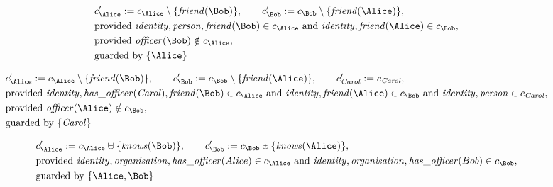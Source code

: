 \begin{align*}
&
c'_
{
\Alice
}
 := 
c_
{
\Alice
}
 \setminus 
\{
\mathit{\detokenize{
friend
}}
(
\Bob
)
\}
, \qquad 
c'_
{
\Bob
}
 := 
c_
{
\Bob
}
 \setminus 
\{
\mathit{\detokenize{
friend
}}
(
\Alice
)
\}
,\\
&
\text{provided } 
\mathit{\detokenize{
identity
}}
,
\mathit{\detokenize{
person
}}
,
\mathit{\detokenize{
friend
}}
(
\Bob
)
 \in c_
{
\Alice
}
 \text{ and } 
\mathit{\detokenize{
identity
}}
,
\mathit{\detokenize{
friend
}}
(
\Alice
)
 \in c_
{
\Bob
}
,\\
&
\text{provided } 
\mathit{\detokenize{
officer
}}
(
\Bob
)
 \notin c_
{
\Alice
}
,\\
&
\text{guarded by } \{
\Alice
\}
\end{align*}

\begin{align*}
&
c'_
{
\Alice
}
 := 
c_
{
\Alice
}
 \setminus 
\{
\mathit{\detokenize{
friend
}}
(
\Bob
)
\}
, \qquad 
c'_
{
\Bob
}
 := 
c_
{
\Bob
}
 \setminus 
\{
\mathit{\detokenize{
friend
}}
(
\Alice
)
\}
, \qquad 
c'_
{
\mathit{Carol}
}
 := 
c_
{
\mathit{Carol}
}
,\\
&
\text{provided } 
\mathit{\detokenize{
identity
}}
,
\mathit{\detokenize{
has_officer
}}
(
\mathit{Carol}
)
,
\mathit{\detokenize{
friend
}}
(
\Bob
)
 \in c_
{
\Alice
}
 \text{ and } 
\mathit{\detokenize{
identity
}}
,
\mathit{\detokenize{
friend
}}
(
\Alice
)
 \in c_
{
\Bob
}
 \text{ and } 
\mathit{\detokenize{
identity
}}
,
\mathit{\detokenize{
person
}}
 \in c_
{
\mathit{Carol}
}
,\\
&
\text{provided } 
\mathit{\detokenize{
officer
}}
(
\Alice
)
 \notin c_
{
\Bob
}
,\\
&
\text{guarded by } \{
\mathit{Carol}
\}
\end{align*}

\begin{align*}
&
c'_
{
\Alice
}
 := 
c_
{
\Alice
}
 \uplus 
\{
\mathit{\detokenize{
knows
}}
(
\Bob
)
\}
, \qquad 
c'_
{
\Bob
}
 := 
c_
{
\Bob
}
 \uplus 
\{
\mathit{\detokenize{
knows
}}
(
\Alice
)
\}
,\\
&
\text{provided } 
\mathit{\detokenize{
identity
}}
,
\mathit{\detokenize{
organisation
}}
,
\mathit{\detokenize{
has_officer
}}
(
Alice
)
 \in c_
{
\Alice
}
 \text{ and } 
\mathit{\detokenize{
identity
}}
,
\mathit{\detokenize{
organisation
}}
,
\mathit{\detokenize{
has_officer
}}
(
Bob
)
 \in c_
{
\Bob
}
,\\
&
\text{guarded by } \{
\Alice
,
\Bob
\}
\end{align*}

